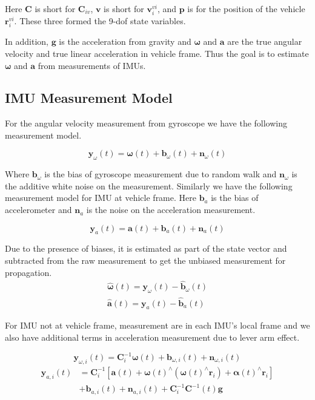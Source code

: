 \documentclass[conference]{IEEEtran}
\begin{document}
Here $\textbf{C}$ is short for $\textbf{C}_{iv}$, $\textbf{v}$ is short for $\textbf{v}_i^{vi}$, and $\textbf{p}$ is for the position of the vehicle $\textbf{r}_i^{vi}$. These three formed the 9-dof state variables.

In addition, $\textbf{g}$ is the acceleration from gravity and $\bm{\omega}$ and $\textbf{a}$ are the true angular velocity and true linear acceleration in vehicle frame. Thus the goal is to estimate $\bm{\omega}$ and $\textbf{a}$ from measurements of IMUs.

\subsection{IMU Measurement Model}

For the angular velocity measurement from gyroscope we have the following measurement model.

\begin{equation}
    \textbf{y}_\omega(t) = \bm{\omega}(t) + \textbf{b}_\omega(t) + \textbf{n}_\omega(t)
\end{equation}

Where $\textbf{b}_\omega$ is the bias of gyroscope measurement due to random walk and $\textbf{n}_\omega$ is the additive white noise on the measurement. Similarly we have the following measurement model for IMU at vehicle frame. Here $\textbf{b}_a$ is the bias of accelerometer and $\textbf{n}_a$ is the noise on the acceleration measurement.

\begin{equation}
    \textbf{y}_a(t) = \textbf{a}(t) + \textbf{b}_a(t) + \textbf{n}_a(t)
\end{equation}

Due to the presence of biases, it is estimated as part of the state vector and subtracted from the raw measurement to get the unbiased measurement for propagation.
\begin{equation}
\begin{split}
    \hat{\bm{\omega}}(t) = \textbf{y}_\omega(t) - \hat{\textbf{b}}_\omega(t) \\
    \hat{\textbf{a}}(t)  = \textbf{y}_a(t) - \hat{\textbf{b}}_a(t)
\end{split}
\end{equation}

For IMU not at vehicle frame, measurement are in each IMU's local frame and we also have additional terms in acceleration measurement due to lever arm effect.

\begin{equation}
    \textbf{y}_{\omega,i}(t) = \textbf{C}_{i}^{-1} \bm{\omega}(t) + \textbf{b}_{\omega, i}(t) + \textbf{n}_{\omega,i}(t)
\end{equation}
\begin{equation}
\begin{split}
    \textbf{y}_{a,i}(t) &= \textbf{C}_i^{-1} \left[ \textbf{a}(t) + \bm{\omega}(t)^\wedge (\bm{\omega}(t)^\wedge \textbf{r}_i) + \bm{\alpha}(t)^\wedge \textbf{r}_i \right] \\
    &+ \textbf{b}_{a,i}(t) + \textbf{n}_{a,i}(t) + \textbf{C}_i^{-1} \textbf{C}^{-1}(t) \textbf{g}
\end{split}
\end{equation}
\end{document}
